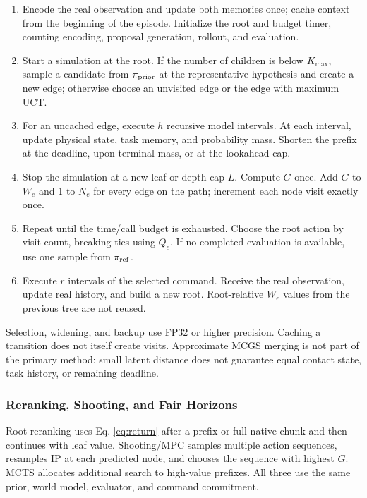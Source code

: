 \documentclass[
  10pt,
]{article}
\providecommand{\tightlist}{%
  \setlength{\itemsep}{0pt}\setlength{\parskip}{0pt}}
\begin{document}
\begin{enumerate}
\def\labelenumi{\arabic{enumi}.}
\tightlist
\item
  Encode the real observation and update both memories once; cache context from the beginning of the episode. Initialize the root and budget timer, counting encoding, proposal generation, rollout, and evaluation.
\item
  Start a simulation at the root. If the number of children is below \(K_{\max}\), sample a candidate from \(\pi_{\rm prior}\) at the representative hypothesis and create a new edge; otherwise choose an unvisited edge or the edge with maximum UCT.
\item
  For an uncached edge, execute \(h\) recursive model intervals. At each interval, update physical state, task memory, and probability mass. Shorten the prefix at the deadline, upon terminal mass, or at the lookahead cap.
\item
  Stop the simulation at a new leaf or depth cap \(L\). Compute \(G\) once. Add \(G\) to \(W_e\) and 1 to \(N_e\) for every edge on the path; increment each node visit exactly once.
\item
  Repeat until the time/call budget is exhausted. Choose the root action by visit count, breaking ties using \(Q_e\). If no completed evaluation is available, use one sample from \(\pi_{\rm ref}\).
\item
  Execute \(r\) intervals of the selected command. Receive the real observation, update real history, and build a new root. Root-relative \(W_e\) values from the previous tree are not reused.
\end{enumerate}

Selection, widening, and backup use FP32 or higher precision. Caching a transition does not itself create visits. Approximate MCGS merging is not part of the primary method: small latent distance does not guarantee equal contact state, task history, or remaining deadline.

\hypertarget{reranking-shooting-vuxe0-horizon-cuxf4ng-bux1eb1ng}{%
\subsubsection{Reranking, Shooting, and Fair Horizons}\label{reranking-shooting-vuxe0-horizon-cuxf4ng-bux1eb1ng}}

Root reranking uses Eq. \eqref{eq:return} after a prefix or full native chunk and then continues with leaf value. Shooting/MPC samples multiple action sequences, resamples IP at each predicted node, and chooses the sequence with highest \(G\). MCTS allocates additional search to high-value prefixes. All three use the same prior, world model, evaluator, and command commitment.
\end{document}
